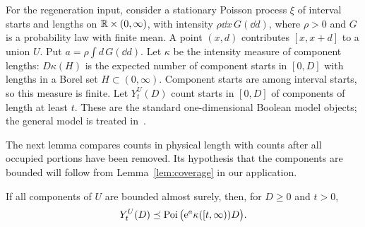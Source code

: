 \documentclass[11pt,letterpaper]{article}
\begin{document}
For the regeneration input, consider a stationary Poisson process $\xi$ of interval starts and lengths on $\mathbb R\times(0,\infty)$, with intensity $\rho\dd x\,G(\dd d)$, where $\rho>0$ and $G$ is a probability law with finite mean. A point $(x,d)$ contributes $[x,x+d]$ to a union $U$. Put $a=\rho\int d\,G(\dd d)$. Let $\kappa$ be the intensity measure of component lengths: $D\kappa(H)$ is the expected number of component starts in $[0,D]$ with lengths in a Borel set $H\subset(0,\infty)$. Component starts are among interval starts, so this measure is finite. Let $Y_t^U(D)$ count starts in $[0,D]$ of components of length at least $t$. These are the standard one-dimensional Boolean model objects; the general model is treated in~\cite[Chapter~17]{LP17}.

The next lemma compares counts in physical length with counts after all occupied portions have been removed. Its hypothesis that the components are bounded will follow from Lemma~\ref{lem:coverage} in our application.

\begin{lemma}\label{lem:regeneration}
If all components of $U$ are bounded almost surely, then, for $D\ge0$ and $t>0$,
\begin{equation}\label{eq:regeneration}
 Y_t^U(D)\preceq\operatorname{Poi}\big(\mathrm{e}^a\kappa([t,\infty))D\big).
\end{equation}
\end{lemma}
\end{document}
